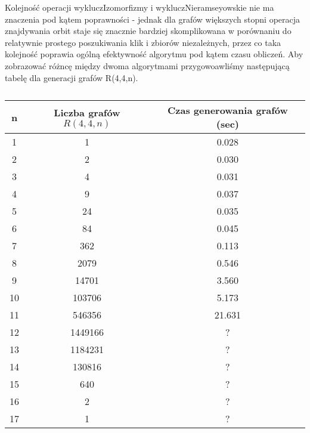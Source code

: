 Kolejność operacji wykluczIzomorfizmy i wykluczNieramseyowskie nie ma znaczenia pod kątem poprawności - jednak dla grafów większych stopni operacja znajdywania orbit staje się znacznie bardziej skomplikowana w porównaniu do relatywnie prostego poszukiwania klik i zbiorów niezależnych, przez co taka kolejność poprawia ogólną efektywność algorytmu pod kątem czasu obliczeń. Aby zobrazować różncę między dwoma algorytmami przygowoawliśmy następującą tabelę dla generacji grafów R(4,4,n).

\begin{table}[H]
 \begin{center}
 \begin{tabular}{|c c c|} 
 \hline
 n & Liczba grafów $R(4,4,n)$ & Czas generowania grafów (sec)  \\ 
 \hline\hline
 1 & 1 & 0.028 \\ 
 \hline
 2 & 2 & 0.030\\
 \hline
 3 & 4 & 0.031\\
 \hline
 4 & 9 & 0.037\\
 \hline
 5 & 24 & 0.035\\
 \hline
 6 & 84 & 0.045\\
 \hline
 7 & 362 & 0.113\\
 \hline
 8 & 2079 & 0.546\\
 \hline
 9 & 14701 & 3.560\\
 \hline
 10 & 103706 & 5.173\\
 \hline
 11 & 546356 & 21.631\\
 \hline
 12 & 1449166 & ?\\
 \hline
 13 & 1184231 & ?\\
 \hline
 14 & 130816 & ?\\
 \hline
 15 & 640 & ?\\
 \hline
 16 & 2 & ?\\
 \hline
 17 & 1 & ?\\
 \hline
\end{tabular}
\end{center}
 \caption{}
 \end{table}

